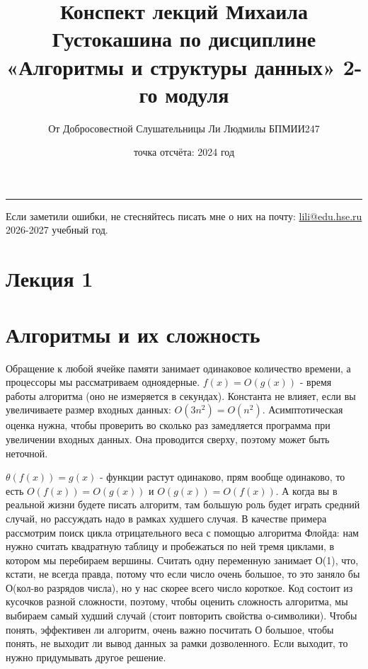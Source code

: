 \documentclass[12pt]{article}
\title{Конспект лекций Михаила Густокашина по дисциплине «Алгоритмы и структуры данных» 2-го модуля}
\author{От Добросовестной Слушательницы Ли Людмилы БПМИИ247}
\date{точка отсчёта: 2024 год}
\begin{document}
\maketitle
\vfill %
\rule{\textwidth}{0.4pt} %
\begin{flushright} 
    Если заметили ошибки, не стесняйтесь писать мне о них на почту:
    \href{mailto:lili@edu.hse.ru}{lili@edu.hse.ru}\\
    2026-2027 учебный год.
\end{flushright}

\newpage
\tableofcontents

\newpage

\section*{Лекция 1}
\section*{Алгоритмы и их сложность}
Обращение к любой ячейке памяти занимает одинаковое количество времени, а процессоры мы рассматриваем одноядерные. $f(x) = O(g(x))$ - время работы алгоритма (оно не измеряется в секундах). Константа не влияет, если вы увеличиваете размер входных данных: $O(3n^2) = O(n^2)$. Асимптотическая оценка нужна, чтобы проверить во сколько раз замедляется программа при увеличении входных данных. Она проводится сверху, поэтому может быть неточной.

$\theta(f(x)) = g(x)$ - функции растут одинаково, прям вообще одинаково, то есть $O(f(x)) = O(g(x))$ и $O(g(x)) = O(f(x))$. А когда вы в реальной жизни будете писать алгоритм, там большую роль будет играть средний случай, но рассуждать надо в рамках худшего случая. В качестве примера рассмотрим поиск цикла отрицательного веса с помощью алгоритма Флойда: нам нужно считать квадратную таблицу и пробежаться по ней тремя циклами, в котором мы перебираем вершины. Считать одну переменную занимает О(1), что, кстати, не всегда правда, потому что если число очень большое, то это заняло бы О(кол-во разрядов числа), но у нас скорее всего число короткое. Код состоит из кусочков разной сложности, поэтому, чтобы оценить сложность алгоритма, мы выбираем самый худший случай (стоит повторить свойства о-символики). Чтобы понять, эффективен ли алгоритм, очень важно посчитать О большое, чтобы понять, не выходит ли вывод данных за рамки дозволенного. Если выходит, то нужно придумывать другое решение.
\end{document}

